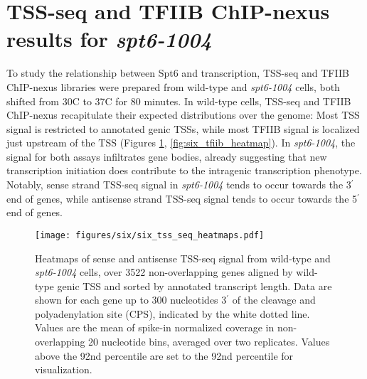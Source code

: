 
\section{TSS-seq and TFIIB ChIP-nexus results for \textit{spt6-1004}}

To study the relationship between Spt6 and transcription, TSS-seq and TFIIB ChIP-nexus libraries were prepared from wild-type and \textit{spt6-1004} cells, both shifted from 30\textdegree C to 37\textdegree C for 80 minutes.
In wild-type cells, TSS-seq and TFIIB ChIP-nexus recapitulate their expected distributions over the genome: Most TSS signal is restricted to annotated genic TSSs, while most TFIIB signal is localized just upstream of the TSS (Figures \ref{fig:six_tss_seq_heatmaps}, \ref{fig:six_tfiib_heatmap}).
In \textit{spt6-1004}, the signal for both assays infiltrates gene bodies, already suggesting that new transcription initiation does contribute to the intragenic transcription phenotype.
Notably, sense strand TSS-seq signal in \textit{spt6-1004} tends to occur towards the 3$^\prime$ end of genes, while antisense strand TSS-seq signal tends to occur towards the 5$^\prime$ end of genes.

\begin{figure}[H]
\centering
\texttt{[image: figures/six/six\_tss\_seq\_heatmaps.pdf]}
\caption[Heatmaps of sense and antisense TSS-seq signal from wild-type and \textit{spt6-1004} cells, over non-overlapping coding genes.]{Heatmaps of sense and antisense TSS-seq signal from wild-type and \textit{spt6-1004} cells, over 3522 non-overlapping genes aligned by wild-type genic TSS and sorted by annotated transcript length. Data are shown for each gene up to 300 nucleotides 3$^\prime$ of the cleavage and polyadenylation site (CPS), indicated by the white dotted line. Values are the mean of spike-in normalized coverage in non-overlapping 20 nucleotide bins, averaged over two replicates. Values above the 92nd percentile are set to the 92nd percentile for visualization.}
\label{fig:six_tss_seq_heatmaps}
\end{figure}

